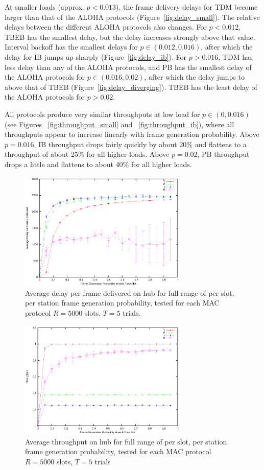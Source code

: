 \documentclass[twocolumn]{article}
\begin{document}
At smaller loads (approx. $p<0.013$), the frame delivery delays for TDM become
larger than that of the ALOHA protocols (Figure~\ref{fig:delay_small}). The relative delays 
between the different ALOHA protocols also changes. For $p<0.012$, TBEB has the smallest delay,
but the delay increases strongly above that value. Interval backoff has the smallest delays
for 
$p \in (0.012, 0.016)$, after which the delay for IB jumps up sharply (Figure~\ref{fig:delay_ib}).
For $p > 0.016$, TDM has less delay than any of the ALOHA protocols, and PB has the smallest 
delay of the ALOHA protocols for $p \in (0.016, 0.02)$, after which the delay jumps to above
that of TBEB (Figure~\ref{fig:delay_diverging}). TBEB has the least delay of the ALOHA protocols
for $p > 0.02$.

All protocols produce very similar throughputs at low load for $p \in (0, 0.016)$
(see Figures ~\ref{fig:throughput_small} and ~\ref{fig:throughput_ib}), where
all throughputs appear to increase linearly with frame generation probability. 
Above $p=0.016$, IB throughput drops fairly quickly by about 20\% and flattens to a throughput
of about 25\% for all higher loads. Above $p=0.02$, PB throughput drops a little and flattens
to about 40\% for all higher loads. 

\begin{figure}
    \centering \includegraphics[width=8cm]{plots/fullrange_delay5000.eps}
    \caption{Average delay per frame delivered on hub for full range of per
    slot, per station frame generation probability, tested for each MAC
    protocol  $R=5000$ slots, $T = 5$ trials.}
    \label{fig:fullrange_delay}
\end{figure}

\begin{figure}
    \centering \includegraphics[width=8cm]{plots/fullrange_throughput5000.eps}
    \caption{Average throughput on hub for full range of per
    slot, per station frame generation probability, tested for each MAC
    protocol  $R=5000$ slots, $T = 5$ trials } 
    \label{fig:fullrange_throughput}
\end{figure}
\end{document}
